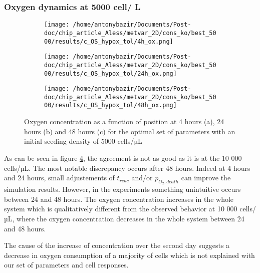 \documentclass[11pt,a4paper]{article}
\begin{document}
\subsubsection{Oxygen dynamics at 5000 cell/ \textmu L}
\begin{figure}[ht!]
\begin{subfigure}{0.33\textwidth}
	\centering
	\texttt{[image: /home/antonybazir/Documents/Post-doc/chip\_article\_Aless/metvar\_2D/cons\_ko/best\_5000/results/c\_OS\_hypox\_tol/4h\_ox.png]}
	\caption{ \label{4h_ox_best_5000}}
\end{subfigure}
\begin{subfigure}{0.33\textwidth}
	\centering
	\texttt{[image: /home/antonybazir/Documents/Post-doc/chip\_article\_Aless/metvar\_2D/cons\_ko/best\_5000/results/c\_OS\_hypox\_tol/24h\_ox.png]}
	\caption{ \label{24h_ox_best_5000}}
\end{subfigure}
\begin{subfigure}{0.33\textwidth}
	\centering
	\texttt{[image: /home/antonybazir/Documents/Post-doc/chip\_article\_Aless/metvar\_2D/cons\_ko/best\_5000/results/c\_OS\_hypox\_tol/48h\_ox.png]}
	\caption{ \label{48h_ox_best_5000}}
\end{subfigure}
\caption{Oxygen concentration as a function of position at 4 hours (a), 24 hours (b) and 48 hours (c) for the optimal set of parameters with an initial seeding density of 5000 cells/µL\label{Ox_best_5000}}
\end{figure}

As can be seen in figure \ref{Ox_best_5000}, the agreement is not as good as it is at the 10 000 cells/µL. The most notable discrepancy occurs after 48 hours. Indeed at 4 hours and 24 hours, small adjustements of $t_{reac}$ and/or $p_{O_2,death}$ can improve the simulation results. However, in the experiments something unintuitive occurs between 24 and 48 hours. The oxygen concentration increases in the whole system which is qualitatively different from the observed behavior at 10 000 cells/µL, where the oxygen concentration decreases in the whole system between 24 and 48 hours. 

The cause of the increase of concentration over the second day suggests a decrease in oxygen consumption of a majority of cells which is not explained with our set of parameters and cell responses.
\end{document}
